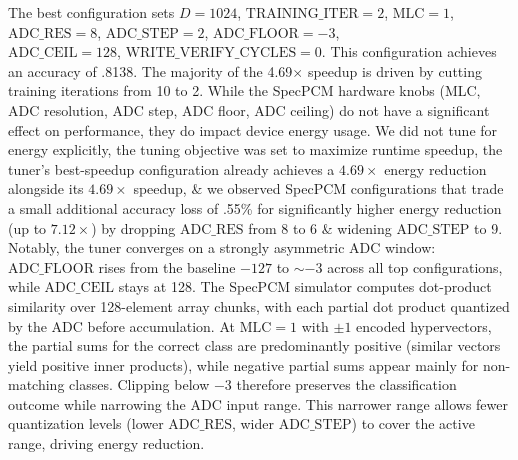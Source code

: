 The best configuration sets $D{=}1024$, $\text{TRAINING\_ITER}{=}2$, $\text{MLC}{=}1$, $\text{ADC\_RES}{=}8$, $\text{ADC\_STEP}{=}2$, $\text{ADC\_FLOOR}{=}{-}3$,\\  $\text{ADC\_CEIL}{=}128$, $\text{WRITE\_VERIFY\_CYCLES}{=}0$. This configuration achieves an accuracy of .8138. The majority of the 4.69$\times$ speedup is driven by cutting training iterations from 10 to 2. While the SpecPCM hardware knobs (MLC, ADC resolution, ADC step, ADC floor, ADC ceiling) do not have a significant effect on performance, they do impact device energy usage. We did not tune for energy explicitly, the tuning objective was set to maximize runtime speedup, the tuner's best-speedup configuration already achieves a $4.69\times$ energy reduction alongside its $4.69\times$ speedup, \& we observed SpecPCM configurations that trade a small additional accuracy loss of .55\% for significantly higher energy reduction (up to $7.12\times$) by dropping $\text{ADC\_RES}$ from 8 to 6 \& widening $\text{ADC\_STEP}$ to 9. Notably, the tuner converges on a strongly asymmetric ADC window: $\text{ADC\_FLOOR}$ rises from the baseline ${-}127$ to $\sim{-}3$ across all top configurations, while $\text{ADC\_CEIL}$ stays at 128.  The SpecPCM simulator computes dot-product similarity over 128-element array chunks, with each partial dot product quantized by the ADC before accumulation. At $\text{MLC}{=}1$ with $\pm 1$ encoded hypervectors, the partial sums for the correct class are predominantly positive (similar vectors yield positive inner products), while negative partial sums appear mainly for non-matching classes. Clipping below ${-}3$ therefore preserves the classification outcome while narrowing the ADC input range. This narrower range allows fewer quantization levels (lower $\text{ADC\_RES}$, wider $\text{ADC\_STEP}$) to cover the active range, driving  energy reduction.

